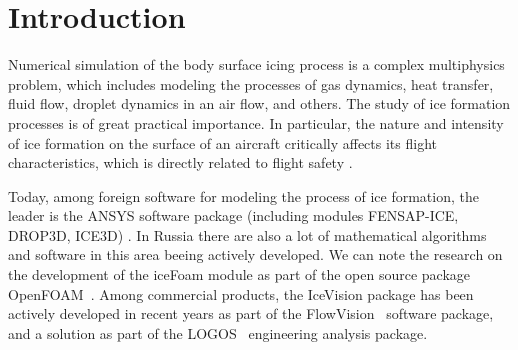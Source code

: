 \documentclass[
11pt,%
tightenlines,%
twoside,%
onecolumn,%
nofloats,%
nobibnotes,%
nofootinbib,%
superscriptaddress,%
noshowpacs,%
centertags]%
{revtex4}
\begin{document}


\maketitle


\section{Introduction}

Numerical simulation of the body surface icing process is a complex multiphysics problem, which includes modeling the processes of gas dynamics, heat transfer, fluid flow, droplet dynamics in an air flow, and others.
The study of ice formation processes is of great practical importance.
In particular, the nature and intensity of ice formation on the surface of an aircraft critically affects its flight characteristics, which is directly related to flight safety \cite{Raj}.

Today, among foreign software for modeling the process of ice formation, the leader is the ANSYS software package (including modules FENSAP-ICE, DROP3D, ICE3D) \cite{Martini}.
In Russia there are also a lot of mathematical algorithms and software in this area beeing actively developed.
We can note the research on the development of the iceFoam module as part of the open source package OpenFOAM~\cite{Strijhak}.
Among commercial products, the IceVision package has been actively developed in recent years as part of the FlowVision~\cite{Sorokin} software package, and a solution as part of the LOGOS~\cite{Galanov} engineering analysis package.
\end{document}
